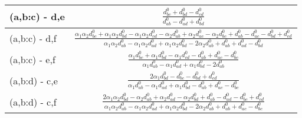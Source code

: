 \documentclass[12pt]{article}
\begin{document}
\renewcommand*{\arraystretch}{2.3}
\begin{longtable}{l|c}\hline
(a,b:c) - d,e& {$\displaystyle \frac{d^{\scriptscriptstyle 0}_{bc} + d^{\scriptscriptstyle 0}_{bd} - d^{\scriptscriptstyle 0}_{cd}}{d^{\scriptscriptstyle 0}_{ab} - d^{\scriptscriptstyle 0}_{ad} + d^{\scriptscriptstyle 0}_{bd}} $}\\[0.4cm]\hline 
(a,b:c) - d,f& {$\displaystyle \frac{\alpha_{1} \alpha_{2} d^{\scriptscriptstyle 0}_{bc} + \alpha_{1} \alpha_{2} d^{\scriptscriptstyle 0}_{bd} - \alpha_{1} \alpha_{2} d^{\scriptscriptstyle 0}_{cd} - \alpha_{2} d^{\scriptscriptstyle 0}_{ab} + \alpha_{2} d^{\scriptscriptstyle 0}_{ac} - \alpha_{2} d^{\scriptscriptstyle 0}_{bc} + d^{\scriptscriptstyle 0}_{ab} - d^{\scriptscriptstyle 0}_{ac} - d^{\scriptscriptstyle 0}_{bd} + d^{\scriptscriptstyle 0}_{cd}}{\alpha_{1} \alpha_{2} d^{\scriptscriptstyle 0}_{ab} - \alpha_{1} \alpha_{2} d^{\scriptscriptstyle 0}_{ad} + \alpha_{1} \alpha_{2} d^{\scriptscriptstyle 0}_{bd} - 2 \alpha_{2} d^{\scriptscriptstyle 0}_{ab} + d^{\scriptscriptstyle 0}_{ab} + d^{\scriptscriptstyle 0}_{ad} - d^{\scriptscriptstyle 0}_{bd}} $}\\[0.4cm]\hline 
(a,b:c) - e,f& {$\displaystyle \frac{\alpha_{1} d^{\scriptscriptstyle 0}_{bc} + \alpha_{1} d^{\scriptscriptstyle 0}_{bd} - \alpha_{1} d^{\scriptscriptstyle 0}_{cd} - d^{\scriptscriptstyle 0}_{ab} + d^{\scriptscriptstyle 0}_{ac} - d^{\scriptscriptstyle 0}_{bc}}{\alpha_{1} d^{\scriptscriptstyle 0}_{ab} - \alpha_{1} d^{\scriptscriptstyle 0}_{ad} + \alpha_{1} d^{\scriptscriptstyle 0}_{bd} - 2 d^{\scriptscriptstyle 0}_{ab}} $}\\[0.4cm]\hline 
(a,b:d) - c,e& {$\displaystyle \frac{2 \alpha_{1} d^{\scriptscriptstyle 0}_{bd} - d^{\scriptscriptstyle 0}_{bc} - d^{\scriptscriptstyle 0}_{bd} + d^{\scriptscriptstyle 0}_{cd}}{\alpha_{1} d^{\scriptscriptstyle 0}_{ab} - \alpha_{1} d^{\scriptscriptstyle 0}_{ad} + \alpha_{1} d^{\scriptscriptstyle 0}_{bd} - d^{\scriptscriptstyle 0}_{ab} + d^{\scriptscriptstyle 0}_{ac} - d^{\scriptscriptstyle 0}_{bc}} $}\\[0.4cm]\hline 
(a,b:d) - c,f& {$\displaystyle \frac{2 \alpha_{1} \alpha_{2} d^{\scriptscriptstyle 0}_{bd} - \alpha_{2} d^{\scriptscriptstyle 0}_{ab} + \alpha_{2} d^{\scriptscriptstyle 0}_{ad} - \alpha_{2} d^{\scriptscriptstyle 0}_{bd} + d^{\scriptscriptstyle 0}_{ab} - d^{\scriptscriptstyle 0}_{ad} - d^{\scriptscriptstyle 0}_{bc} + d^{\scriptscriptstyle 0}_{cd}}{\alpha_{1} \alpha_{2} d^{\scriptscriptstyle 0}_{ab} - \alpha_{1} \alpha_{2} d^{\scriptscriptstyle 0}_{ad} + \alpha_{1} \alpha_{2} d^{\scriptscriptstyle 0}_{bd} - 2 \alpha_{2} d^{\scriptscriptstyle 0}_{ab} + d^{\scriptscriptstyle 0}_{ab} + d^{\scriptscriptstyle 0}_{ac} - d^{\scriptscriptstyle 0}_{bc}} $}\\[0.4cm]\hline 

\end{longtable}
\end{document}
